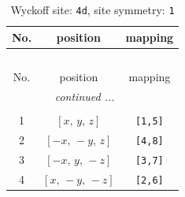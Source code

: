 \documentclass[fleqn,8pt]{jsarticle}
\begin{document}
\begin{longtable}{ccc}
\caption{Wyckoff site: {\tt 4d}, site symmetry: {\tt 1}}
 \\
 \hline \hline
No. & position & mapping \\ \hline \endfirsthead

\multicolumn{2}{l}{\tablename\ \thetable{}} \\
 \hline \hline
No. & position & mapping \\ \hline \endhead

 \hline \hline
\multicolumn{2}{r}{\footnotesize\it continued ...} \\ \endfoot

 \hline \hline
\multicolumn{2}{r}{} \\ \endlastfoot

1 & $\left[ x,\, y,\, z \right]$ & {\tt [1,5]} \\ \hline
2 & $\left[ - x,\, - y,\, z \right]$ & {\tt [4,8]} \\ \hline
3 & $\left[ - x,\, y,\, - z \right]$ & {\tt [3,7]} \\ \hline
4 & $\left[ x,\, - y,\, - z \right]$ & {\tt [2,6]} \\
\end{longtable}
\end{document}
